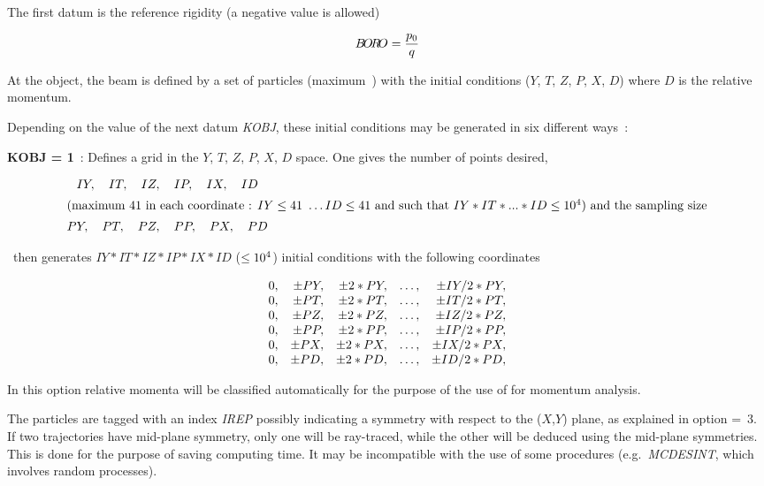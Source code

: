 \noindent The first datum is the reference rigidity (a negative value is 
allowed)
 
$$ B\!O\!R\!O = \dfrac{p_0 }{ q}  $$

\noindent At the object, the beam is defined by a set of particles (maximum~\imax) with 
the initial conditions ($ Y$, $T$, $Z$, $P$, $X$, $D$)  where $ D $ 
is the relative momentum. 

\noindent Depending on the value of the next datum \textsl{KOBJ}, these initial
conditions may be generated   in six different ways~:   
\bigskip

\noindent\textbf{KOBJ  =  1}~:  Defines a grid in the $ Y$, $T$, $Z$, $P$, $X$, $D$
 space. One gives the number of points desired,
 
 \begin{gather*}
	 IY,\quad IT,\quad IZ,\quad IP, \quad IX, \quad ID\\
\intertext{(maximum \ensuremath{41}\ in each coordinate~: $ IY\leq 41\ \ldots ID\leq 41$ and 
such that $ IY * IT * ... * ID\leq 10^4$) and the
		sampling size} 
	 PY,\quad PT,\quad PZ,\quad PP,\quad PX, \quad PD  
 \end{gather*}


\noindent\zgou\  then generates 
$ IY  \ast  IT  \ast  IZ \ast   IP \ast IX \ast  ID $ ($\leq  10^4$) initial conditions with the 
following coordinates

$$
  \begin{array}{*{5}{r<{,}}}
	  0  &  \pm PY &   \pm 2  \ast   PY & \ldots & \pm IY/2  \ast   PY \\
	  0  &  \pm PT &   \pm 2 \ast   PT  & \ldots &  \pm IT/2  \ast   PT \\
	  0  &  \pm PZ &   \pm 2 \ast  PZ   & \ldots &  \pm IZ/2 \ast PZ \\
	  0  &  \pm PP &   \pm 2  \ast PP  & \ldots  &  \pm IP/2  \ast  PP \\
	  0  &  \pm PX &   \pm 2  \ast  PX & \ldots  &  \pm IX/2 \ast   PX \\
 	  0  &  \pm PD &   \pm 2  \ast  PD & \ldots  &  \pm ID/2 \ast   PD 
 \end{array}
 $$

\noindent In this option relative momenta will be classified automatically for
the purpose of the use of \IMAGES{} for momentum analysis.


\noindent The particles are tagged with an index \textsl{IREP} possibly
indicating a symmetry with respect to the ($ X$,$Y$) plane, as explained in option 
\mbox{\KOBJ= 3}. If two trajectories have mid-plane symmetry, only one  will be 
ray-traced, while the other will be deduced using the mid-plane 
symmetries. This is done for the purpose of saving computing time. It may 
be incompatible with the use of some procedures (e.g.~\textsl{MCDESINT}, which 
involves random processes). 

